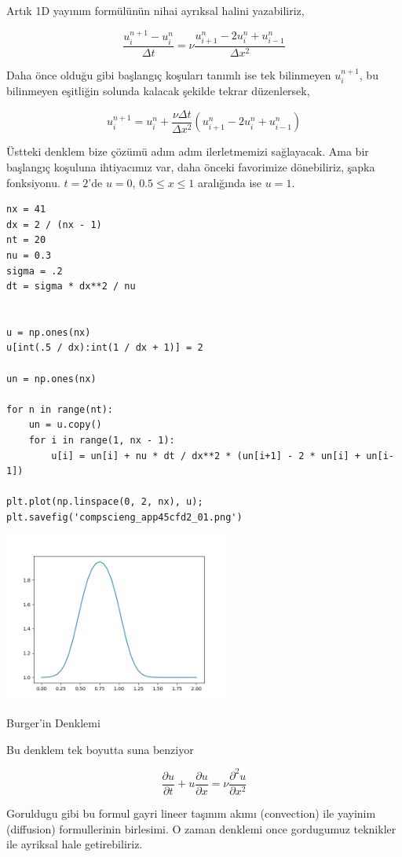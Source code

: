 \documentclass[12pt,fleqn]{article}\usepackage{../../common}
\begin{document}
Artık 1D yayınım formülünün nihai ayrıksal halini yazabiliriz,

$$
\frac{u_{i}^{n+1}-u_{i}^{n}}{\Delta t} =
\nu\frac{u_{i+1}^{n}-2u_{i}^{n}+u_{i-1}^{n}}{\Delta x^2}
$$

Daha önce olduğu gibi başlangıç koşuları tanımlı ise tek bilinmeyen
$u_{i}^{n+1}$, bu bilinmeyen eşitliğin solunda kalacak şekilde tekrar
düzenlersek,


$$
u_{i}^{n+1} =
u_{i}^{n}+\frac{\nu\Delta t}{\Delta x^2}(u_{i+1}^{n}-2u_{i}^{n}+u_{i-1}^{n})
$$

Üstteki denklem bize çözümü adım adım ilerletmemizi sağlayacak. Ama bir
başlangıç koşuluna ihtiyacımız var, daha önceki favorimize dönebiliriz, şapka
fonksiyonu. $t=2$'de $u=0$, $0.5\le x\le 1$ aralığında ise $u=1$. 

\begin{verbatim}
nx = 41
dx = 2 / (nx - 1)
nt = 20 
nu = 0.3 
sigma = .2 
dt = sigma * dx**2 / nu 


u = np.ones(nx)     
u[int(.5 / dx):int(1 / dx + 1)] = 2 

un = np.ones(nx)

for n in range(nt): 
    un = u.copy() 
    for i in range(1, nx - 1):
        u[i] = un[i] + nu * dt / dx**2 * (un[i+1] - 2 * un[i] + un[i-1])
        
plt.plot(np.linspace(0, 2, nx), u);
plt.savefig('compscieng_app45cfd2_01.png')
\end{verbatim}

\includegraphics[width=20em]{compscieng_app45cfd2_01.png}

Burger'in Denklemi

Bu denklem tek boyutta suna benziyor

$$
\frac{\partial u}{\partial t} + u \frac{\partial u}{\partial x} =
\nu \frac{\partial ^2u}{\partial x^2}
$$

Goruldugu gibi bu formul gayri lineer taşınım akımı (convection) ile yayinim
(diffusion) formullerinin birlesimi. O zaman denklemi once gordugumuz teknikler
ile ayriksal hale getirebiliriz. 
\end{document}
